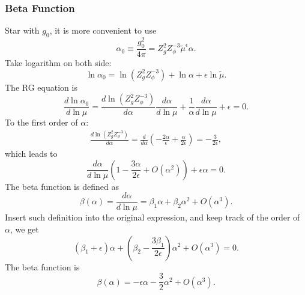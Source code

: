 \subsubsection*{Beta Function}
Star with $g_0$, it is more convenient to use 
\begin{equation}
\alpha_0 
\equiv \frac{g_0^2}{4\pi} 
= Z_g^2 Z_{\phi}^{-3}\tilde{\mu}^{\epsilon}\alpha.
\end{equation}
Take logarithm on both side:
\begin{equation}
\ln \alpha_0 = \ln(Z_g^2 Z_{\phi}^{-3}) 
+ \ln \alpha + \epsilon\ln{\tilde\mu}.
\end{equation}
The RG equation is
\begin{equation}
\frac{d \ln \alpha_0}{d \ln \mu} = 
\frac{d \ln(Z_g^2 Z_{\phi}^{-3}) }{d \alpha}\frac{d \alpha}{d\ln \mu} +
\frac{1}{\alpha}\frac{d \alpha}{d \ln \mu} + \epsilon
=0.
\end{equation}
To the first order of $\alpha$:
\begin{equation}
\begin{aligned}
	\frac{d \ln(Z_g^2 Z_{\phi}^{-3}) }{d \alpha}
	=\frac{d}{d\alpha}\left(-\frac{2\alpha}{\epsilon}+\frac{\alpha}{2\epsilon}\right) 
	= -\frac{3}{2\epsilon},
\end{aligned}
\end{equation}
which leads to
\begin{equation}
	\frac{d\alpha}{d\ln \mu}\left(1-\frac{3\alpha}{2\epsilon}+O(\alpha^2)\right)+\epsilon\alpha = 0.
\end{equation}
The beta function is defined as
\begin{equation}
	\beta(\alpha) = \frac{d\alpha}{d\ln \mu} = \beta_1 \alpha + \beta_2 \alpha^2 + O(\alpha^3).
\end{equation}
Insert such definition into the original expression, and keep track of the order of $\alpha$, we get
\begin{equation}
	(\beta_1+\epsilon)\alpha + \left(\beta_2-\frac{3\beta_1}{2\epsilon}\right)\alpha^2 + O(\alpha^3) = 0.
\end{equation}
The beta function is
\begin{equation}
	\beta(\alpha) = -\epsilon \alpha -\frac{3}{2}\alpha^2 + O(\alpha^3).
\end{equation}



